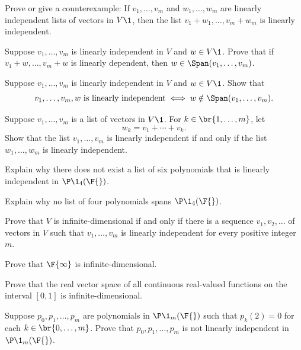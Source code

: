 \exercise
Prove or give a counterexample: If $v_1, \dots, v_m$ and $w_1, \dots, w_m$ are linearly independent lists of vectors in $V\1$, then the list $v_1 + w_1, \dots, v_m + w_m$ is linearly independent.


\exercise
Suppose $v_1, \dots, v_m$ is linearly independent in $V$ and $w \in V\1$.  Prove that
if $v_1 + w, \dots, v_m + w$
is linearly dependent, then $w \in \Span(v_1, \dots, v_m)$.


\exercise
Suppose $v_1, \dots, v_m$ is linearly independent in $V$ and $w \in V\1$. Show that
\[
v_1, \dots, v_m, w \text{ is linearly independent} \iff w \notin \Span (v_1, \dots, v_m).
\]
\exercisedisplayend


\exercise
Suppose $v_1, \ldots, v_m$ is a list of vectors in $V\1$. For $k \in \br{1, \ldots, m}$, let\label{2ind}
\[
w_k = v_1 + \cdots + v_k.
\]
Show that the list $v_1, \ldots, v_m$ is linearly independent if and only if the list $w_1, \ldots, w_m$ is linearly independent.


\exercise
Explain why there does not exist a list of six polynomials that is linearly independent in $\P\1_4(\F{})$.


\exercise
Explain why no list of four polynomials spans $\P\1_4(\F{})$.


\exercise
Prove that $V$ is infinite-dimensional if and only if there is a
sequence $v_1, v_2, \dots$ of vectors in $V$ such that $v_1, \dots, v_m$ is
linearly independent for every positive integer $m$.\label{2infdim}


\exercise
Prove that $\F{\infty}$ is infinite-dimensional.


\exercise
Prove that the real vector space of all continuous real-valued
functions on the interval $[0, 1]$ is infinite-dimensional.


\exercise
Suppose $p_0, p_1, \dots, p_m$ are polynomials in $\P\1_m(\F{})$ such that
$p_k(2) = 0$ for each $k \in \br{0, \ldots, m}$.  Prove that $p_0, p_1, \dots, p_m$ is not linearly
independent in $\P\1_m(\F{})$.


